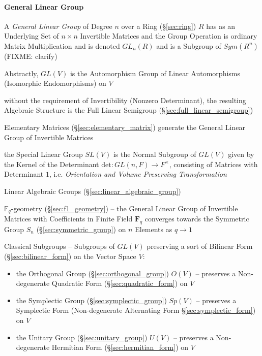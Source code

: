 \paragraph{General Linear Group}\label{sec:general_linear_group}\hfill

A \emph{General Linear Group} of Degree $n$ over a Ring (\S\ref{sec:ring}) $R$
has as an Underlying Set of $n \times n$ Invertible Matrices and the Group
Operation is ordinary Matrix Multiplication and is denoted $GL_n(R)$ and is a
Subgroup of $Sym(R^n)$ (FIXME: clarify)

Abstractly, $GL(V)$ is the Automorphism Group of Linear Automorphisms
(Isomorphic Endomorphisms) on $V$

without the requirement of Invertibility (Nonzero Determinant), the resulting
Algebraic Structure is the Full Linear Semigroup
(\S\ref{sec:full_linear_semigroup})

Elementary Matrices (\S\ref{sec:elementary_matrix}) generate the General Linear
Group of Invertible Matrices

the Special Linear Group $SL(V)$ is the Normal Subgroup of $GL(V)$ given by the
Kernel of the Determinant $\mathrm{det} : GL(n,F) \rightarrow F^\times$,
consisting of Matrices with Determinant $1$, i.e. \emph{Orientation and Volume
  Preserving Transformation}

\fist Linear Algebraic Groups (\S\ref{sec:linear_algebraic_group})

\fist $\mathbb{F}_q$-geometry (\S\ref{sec:f1_geometry}) -- the General Linear
Group of Invertible Matrices with Coefficients in Finite Field $\mathbf{F}_q$
converges towards the Symmetric Group $S_n$ (\S\ref{sec:symmetric_group}) on $n$
Elements as $q \rightarrow 1$

Classical Subgroups -- Subgroups of $GL(V)$ preserving a sort of Bilinear Form
(\S\ref{sec:bilinear_form}) on the Vector Space $V$:
\begin{itemize}
  \item the Orthogonal Group (\S\ref{sec:orthogonal_group}) $O(V)$ -- preserves
    a Non-degenerate Quadratic Form (\S\ref{sec:quadratic_form}) on $V$
  \item the Symplectic Group (\S\ref{sec:symplectic_group}) $Sp(V)$
    -- preserves a Symplectic Form (Non-degenerate Alternating Form
    \S\ref{sec:symplectic_form}) on $V$
  \item the Unitary Group (\S\ref{sec:unitary_group}) $U(V)$
    -- preserves a Non-degenerate Hermitian Form (\S\ref{sec:hermitian_form})
    on $V$
\end{itemize}

